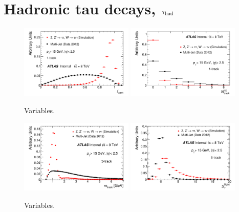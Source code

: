 \section{Hadronic tau decays, $\tau_\text{had}$}
\label{sec:taus-jetfakes}

\begin{figure}[tp]
  \centering
  \includegraphics[width=0.48\textwidth]{figures/PERF-2013-06_tmp/centFrac_1p}
  \includegraphics[width=0.48\textwidth]{figures/PERF-2013-06_tmp/wideTrk_n_1p}
  \caption{Variables.}
  \label{fig:taus-id1p}
\end{figure}

\begin{figure}[tp]
  \centering
  \includegraphics[width=0.48\textwidth]{figures/PERF-2013-06_tmp/massTrkSys_3p}
  \includegraphics[width=0.48\textwidth]{figures/PERF-2013-06_tmp/trFlightPathSig_3p}
  \caption{Variables.}
  \label{fig:taus-id3p}
\end{figure}

